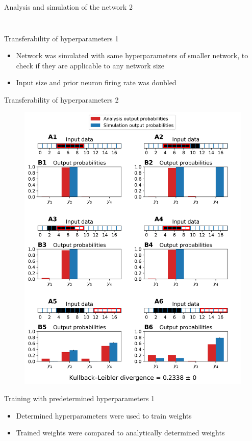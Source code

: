 \documentclass[aspectratio=169]{beamer}
\begin{document}
\begin{frame}{Analysis and
 simulation of the network 2}
\begin{columns}
\begin{column}{0.4\textwidth}
\begin{figure}
      \end{figure}
      \end{column}
    \end{columns} 
\end{frame}

\begin{frame}{Transferability of hyperparameters 1}
  \begin{itemize}
      \item Network was simulated with same hyperparameters of smaller network, to check if they are applicable to any network size
    \item Input size and prior neuron firing rate  was doubled
  \end{itemize}
\end{frame}

\begin{frame}{Transferability of hyperparameters 2}
 \vspace{-1.0cm}
		\begin{figure}
        \includegraphics[width=0.4\linewidth]{../Latex/figures/1D/doubleSize/doubleSize_98_880_4.png}
      \end{figure} 
\end{frame}



\begin{frame}{Training with predetermined hyperparameters 1}
  \begin{itemize}
    \item Determined hyperparameters were used to train weights
    \item Trained weights were compared to analytically determined weights
  \end{itemize}
\end{frame}
\end{document}
